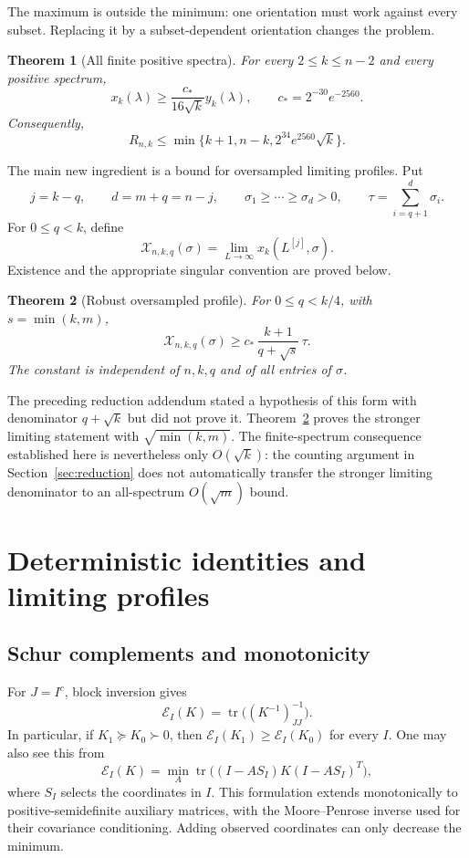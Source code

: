 \documentclass[11pt]{article}
\newtheorem{theorem}{Theorem}[section]
\theoremstyle{remark}\newtheorem{remark}[theorem]{Remark}
\newcommand{\tr}{\operatorname{tr}}
\newcommand{\X}{\mathcal X}
\newcommand{\Err}{\mathcal E}
\newcommand{\cstar}{c_*}
\begin{document}
The maximum is outside the minimum: one orientation must work against every subset. Replacing it by a subset-dependent orientation changes the problem.

\begin{theorem}[All finite positive spectra]\label{th:main}
For every $2\le k\le n-2$ and every positive spectrum,
\[
 x_k(\lambda)\ge \frac{\cstar}{16\sqrt{k}}y_k(\lambda),
 \qquad \cstar=2^{-30}e^{-2560}.
\]
Consequently,
\[
 R_{n,k}\le\min\{k+1,n-k,2^{34}e^{2560}\sqrt{k}\}.
\]
\end{theorem}

The main new ingredient is a bound for oversampled limiting profiles. Put
\[
 j=k-q,\qquad d=m+q=n-j,\qquad
 \sigma_1\ge\cdots\ge\sigma_d>0,
 \qquad \tau=\sum_{i=q+1}^d\sigma_i.
\]
For $0\le q<k$, define
\[
 \X_{n,k,q}(\sigma)
 =\lim_{L\to\infty}x_k(L^{[j]},\sigma).
\]
Existence and the appropriate singular convention are proved below.

\begin{theorem}[Robust oversampled profile]\label{th:robust}
For $0\le q<k/4$, with $s=\min(k,m)$,
\[
 \boxed{\displaystyle
 \X_{n,k,q}(\sigma)\ge
 \cstar\,\frac{k+1}{q+\sqrt{s}}\,\tau.}
\]
The constant is independent of $n,k,q$ and of all entries of $\sigma$.
\end{theorem}

The preceding reduction addendum stated a hypothesis of this form with denominator $q+\sqrt{k}$ but did not prove it. Theorem~\ref{th:robust} proves the stronger limiting statement with $\sqrt{\min(k,m)}$. The finite-spectrum consequence established here is nevertheless only $O(\sqrt{k})$: the counting argument in Section~\ref{sec:reduction} does not automatically transfer the stronger limiting denominator to an all-spectrum $O(\sqrt m)$ bound.

\section{Deterministic identities and limiting profiles}
\subsection{Schur complements and monotonicity}
For $J=I^c$, block inversion gives
\begin{equation}\label{eq:schur}
 \Err_I(K)=\tr\bigl((K^{-1})_{JJ}^{-1}\bigr).
\end{equation}
In particular, if $K_1\succeq K_0\succ0$, then $\Err_I(K_1)\ge\Err_I(K_0)$ for every $I$. One may also see this from
\[
 \Err_I(K)=\min_A\tr\bigl((I-A S_I)K(I-A S_I)^T\bigr),
\]
where $S_I$ selects the coordinates in $I$. This formulation extends monotonically to positive-semidefinite auxiliary matrices, with the Moore--Penrose inverse used for their covariance conditioning. Adding observed coordinates can only decrease the minimum.
\end{document}
